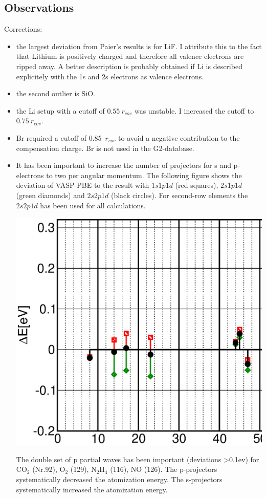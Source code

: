 \documentclass{book}
\begin{document}
\subsection*{Observations}
Corrections: 
\begin{itemize}
\item the largest deviation from Paier's results is for LiF. I
  attribute this to the fact that Lithium is positively charged and
  therefore all valence electrons are ripped away. A better
  description is probably obtained if Li is described explicitely with
  the 1s and 2s electrons as valence electrons.
%
\item the second outlier is SiO.
%
\item the Li setup with a cutoff of $0.55~r_{cov}$ was unstable. I
  increased the cutoff to $0.75~r_{cov}$.
%
\item Br required a cutoff of 0.85~$r_{cov}$ to avoid a negative
  contribution to the compensation charge. Br is not used in the
  G2-database.
%
\item It has been important to increase the number of projectors for s
  and p-electrons to two per angular momentum. The following figure
  shows the deviation of VASP-PBE \cite{paier} to the result with
  $1s1p1d$ (red squares), $2s1p1d$ (green diamonds) and $2s2p1d$
  (black circles). For second-row elements the $2s2p1d$ has been used
  for all calculations.
\begin{center}
\includegraphics[width=\textwidth]{Figs/Nprodep/nprodep.eps}
\end{center}

The double set of p partial waves has been important (deviations
>0.1ev) for CO$_2$ (Nr.92), O$_2$ (129), N$_2$H$_4$ (116), NO
(126). The p-projectors systematically decreased the atomization
energy.  The s-projectors systematically increased the atomization
energy.
\end{itemize}
\end{document}

